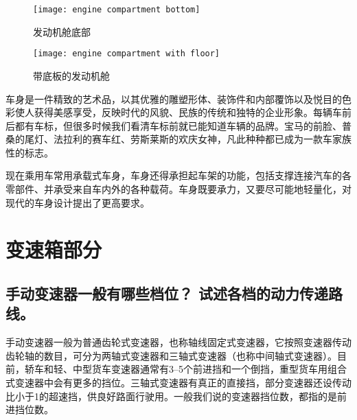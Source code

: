 \documentclass[UTF8]{ctexart}
\numberwithin{figure}{section}
\numberwithin{table}{section}
\begin{document}
\begin{figure}[htbp]
	\centering
	\begin{minipage}[b]{0.4\textwidth}
		\centering
		\texttt{[image: engine compartment bottom]}
		\caption{发动机舱底部}
		\label{engine compartment bottom}
	\end{minipage}
	\begin{minipage}[b]{0.5\textwidth}
		\centering
		\texttt{[image: engine compartment with floor]}
		\caption{带底板的发动机舱}
		\label{engine compartment with floor}
	\end{minipage}
\end{figure}

车身是一件精致的艺术品，以其优雅的雕塑形体、装饰件和内部覆饰以及悦目的色彩使人获得美感享受，反映时代的风貌、民族的传统和独特的企业形象。每辆车前后都有车标，但很多时候我们看清车标前就已能知道车辆的品牌。宝马的前脸、普桑的尾灯、法拉利的赛车红、劳斯莱斯的欢庆女神，凡此种种都已成为一款车家族性的标志。

现在乘用车常用承载式车身，车身还得承担起车架的功能，包括支撑连接汽车的各零部件、并承受来自车内外的各种载荷。车身既要承力，又要尽可能地轻量化，对现代的车身设计提出了更高要求。

\newpage

\section{变速箱部分}
\subsection{手动变速器一般有哪些档位？ 试述各档的动力传递路线。}

\label{subsection:2.1}

手动变速器一般为普通齿轮式变速器，也称轴线固定式变速器，它按照变速器传动齿轮轴的数目，可分为两轴式变速器和三轴式变速器（也称中间轴式变速器）。目前，轿车和轻、中型货车变速器通常有\numrange[range-phrase = $\,\sim\,$]{3}{5}个前进挡和一个倒挡，重型货车用组合式变速器中会有更多的挡位。三轴式变速器有真正的直接挡，部分变速器还设传动比小于1的超速挡，供良好路面行驶用。一般我们说的变速器挡位数，都指的是前进挡位数。
\end{document}
